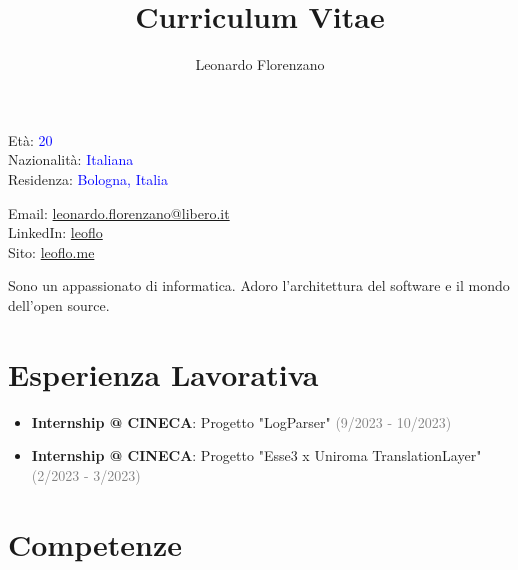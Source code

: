 \documentclass{paper}
\title{Curriculum Vitae}
\author{Leonardo Florenzano}
\begin{document}
\maketitle

\begin{multicols}{2}

\noindent
Età: \textcolor{blue}{20}\\
Nazionalità: \textcolor{blue}{Italiana}\\
Residenza: \textcolor{blue}{Bologna, Italia}

\columnbreak

\noindent
Email: \href{mailto:leonardo.florenzano@libero.it}{leonardo.florenzano@libero.it}\\
LinkedIn: \href{https://www.linkedin.com/in/leoflo}{leoflo}\\
Sito: \href{https://leoflo.me}{leoflo.me}

\end{multicols}

\noindent
Sono un appassionato di informatica. Adoro l'architettura del software e il mondo dell'open source.

\section{Esperienza Lavorativa}

\begin{itemize}
    \item \textbf{Internship @ CINECA}: Progetto "LogParser" \textcolor{gray}{(9/2023 - 10/2023)}
    \item \textbf{Internship @ CINECA}: Progetto "Esse3 x Uniroma TranslationLayer" \textcolor{gray}{(2/2023 - 3/2023)}
\end{itemize}

\section{Competenze}
\end{document}
